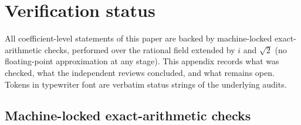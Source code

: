 \section{Verification status}\label{sec:verification}

All coefficient-level statements of this paper are backed by machine-locked exact-arithmetic checks, performed over the
rational field extended by $i$ and $\sqrt2$ (no floating-point approximation at any stage). This appendix records what
was checked, what the independent reviews concluded, and what remains open. Tokens in typewriter font are verbatim status
strings of the underlying audits.

\subsection*{Machine-locked exact-arithmetic checks}

